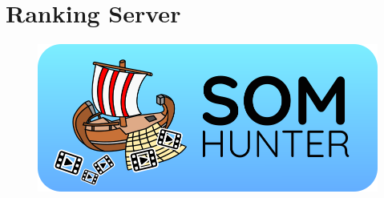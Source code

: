 \chapter{Ranking Server}
\label{comp-ranking-server}

\begin{figure}
	\centering
	\includegraphics[width=\textwidth]{img/somhunter-logo.png}
	\label{fig:logo}
\end{figure}
